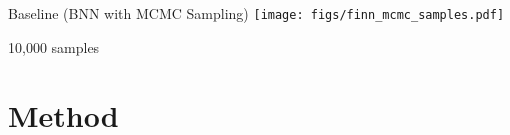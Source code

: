 \documentclass[aspectratio=1610]{beamer}
\begin{document}
\begin{frame}{Baseline (BNN with MCMC Sampling)}
\centering
\texttt{[image: figs/finn\_mcmc\_samples.pdf]}

10,000 samples
\end{frame}

\section{Method}
\end{document}
